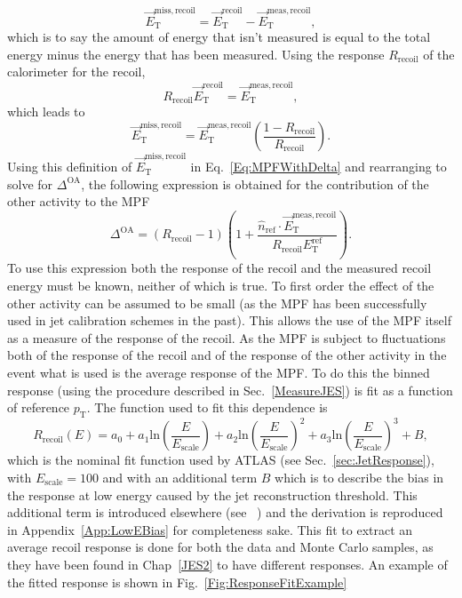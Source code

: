 \begin{equation}
  \vec{E}_{\mathrm T}^{\mathrm{miss, recoil}} = \vec{E}_{\mathrm T}^{\mathrm{recoil}} - \vec{E}_{\mathrm T}^{\mathrm{meas, recoil}}, 
\end{equation}
\noindent 
which is to say the amount of energy that isn't measured is equal to the total energy minus the energy that has been measured.  
Using the response $R_{\mathrm{recoil}}$ of the calorimeter for the recoil, 
\begin{equation}
  R_{\mathrm{recoil}}\vec{E}_{\mathrm T}^{\mathrm{recoil}} = \vec{E}_{\mathrm T}^{\mathrm{meas, recoil}}, 
\end{equation}
\noindent
which leads to 
\begin{equation}
  \vec{E}_{\mathrm T}^{\mathrm{miss, recoil}} = \vec{E}_{\mathrm T}^{\mathrm{meas, recoil}}\left(\frac{1-R_{\mathrm{recoil}}}{R_{\mathrm{recoil}}}\right).  
\end{equation}
\noindent
Using this definition of $\vec{E}_{\mathrm T}^{\mathrm{miss, recoil}}$ in Eq.~\ref{Eq:MPFWithDelta} and rearranging to solve for $\Delta^{\mathrm{OA}}$, the following expression is obtained for the contribution of the other activity to the MPF 
\begin{equation}
  \Delta^{\mathrm{OA}}=\left(R_{\mathrm{recoil}}-1\right)\left(1+\frac{\hat n_{\mathrm{ref}}\cdot \vec{E}_{\mathrm T}^{\mathrm{meas, recoil}}}{R_{\mathrm{recoil}}{E}_{\mathrm T}^{\mathrm{ref}}}\right).  
  \label{Eq:OA}
\end{equation} 
To use this expression both the response of the recoil and the measured recoil energy must be known, neither of which is true.  
To first order the effect of the other activity can be assumed to be small (as the MPF has been successfully used in jet calibration schemes in the past).  
This allows the use of the MPF itself as a measure of the response of the recoil.  
As the MPF is subject to fluctuations both of the response of the recoil and of the response of the other activity in the event what is used is the average response of the MPF.  
To do this the binned response (using the procedure described in Sec.~\ref{MeasureJES}) is fit as a function of reference $p_{\mathrm T}$.  
The function used to fit this dependence is 
\begin{equation}
  R_{\mathrm{recoil}}\left(E\right)=a_0+a_1\mathrm{ln}\left(\frac{E}{E_{\mathrm{scale}}}\right) +a_2\mathrm{ln}\left(\frac{E}{E_{\mathrm{scale}}}\right)^2+a_3\mathrm{ln}\left(\frac{E}{E_{\mathrm{scale}}}\right)^3 + B, 
\end{equation}
which is the nominal fit function used by ATLAS (see Sec.~\ref{sec:JetResponse}), with $E_{\mathrm{scale}}=100$ and with an additional term $B$ which is to describe the bias in the response at low energy caused by the jet reconstruction threshold.  
This additional term is introduced elsewhere (see ~\cite{DougPHD}) and the derivation is reproduced in Appendix~\ref{App:LowEBias} for completeness sake.  
This fit to extract an average recoil response is done for both the data and Monte Carlo samples, as they have been found in Chap~\ref{JES2} to have different responses.  
An example of the fitted response is shown in Fig.~\ref{Fig:ResponseFitExample}


